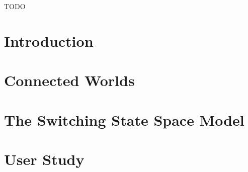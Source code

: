 \documentclass[11pt]{gsasthesis} %
\begin{document}
\renewcommand{\contentsname}{\protect\centering\protect\Large Contents}
\renewcommand{\listtablename}{\protect\centering\protect\Large List of Tables}
\renewcommand{\listfigurename}{\protect\centering\protect\Large List of Figures}

\newcommand{\indep}{\mathrel{\text{\scalebox{1.07}{$\perp\mkern-10mu\perp$}}}}

\tableofcontents %

\listoffigures
\begin{acknowledgments}
  TODO
\end{acknowledgments}



\chapter*{Introduction}\label{ch:intro}



\chapter{Connected Worlds}\label{ch:1}




\chapter{The Switching State Space Model}\label{ch:2}




\chapter{User Study}\label{ch:3}

\end{document}
